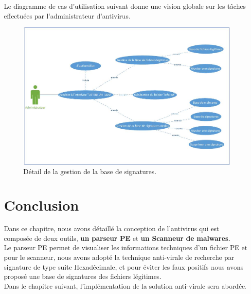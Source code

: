 Le diagramme de cas d'utilisation suivant donne une vision globale sur les tâches effectuées par l'administrateur d'antivirus.
\begin{figure}[H]
\begin{center}
\includegraphics[scale=0.6]{Figures/Admin.jpg}
\caption{Détail de la gestion de la base de signatures.}
\label{fig :mise} 
\end{center}
\end{figure}

\section{Conclusion}
Dans ce chapitre, nous avons détaillé la conception de l'antivirus  qui est composée de deux outils, \textbf{un parseur PE} et \textbf{un Scanneur de malwares}.\\

Le parseur PE permet de visualiser les informations techniques d'un fichier PE et pour le scanneur, nous avons adopté la technique anti-virale de recherche par signature de type suite Hexadécimale, et pour éviter les faux positifs nous avons proposé une base de  signatures des fichiers légitimes.\\

 
Dans le chapitre suivant, l'implémentation de la solution anti-virale sera abordée.